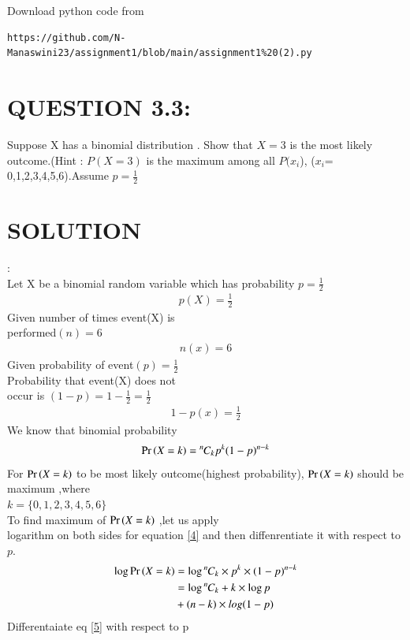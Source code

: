 \documentclass[journal,12pt,twocolumn]{IEEEtran}
\newcommand*{\permcomb}[4][0mu]{{{}^{#3}\mkern#1#2_{#4}}}
\newcommand*{\comb}[1][-1mu]{\permcomb[#1]{C}}
\begin{document}
\renewcommand{\thefigure}{\theenumi}
\renewcommand{\thetable}{\theenumi}

Download python code from 
\begin{lstlisting}
https://github.com/N-Manaswini23/assignment1/blob/main/assignment1%20(2).py
\end{lstlisting}
%



\section*{ QUESTION 3.3:}
Suppose X has a binomial
 distribution . Show that $X = 3$ is the most likely outcome.(Hint : $P(X = 3)$ is the maximum among all $P(x_i$), ($x_i$= 0,1,2,3,4,5,6).Assume $p=\frac{1}{2}$ 
 \\
\section*{SOLUTION}:\\
Let X be a binomial random variable which has probability  $p=\frac{1}{2}$ 
 \begin{align}
p(X)=\frac{1}{2} \label{1}
 \end{align}
Given number of times event(X) is\\
 performed$(n)=6$
 \begin{align}
 n(x)=6 \label{2}
 \end{align}
Given probability of event$(p)= \frac{1}{2}$\\
Probability that event(X) does not \\occur is
$(1-p)=1-\frac{1}{2}=\frac{1}{2} $
 \begin{align}
1-p(x)=\frac{1}{2}\label{3}
 \end{align}
We know that binomial probability
\begin{align}
\pr{X=k} = \comb{n}{k} p^k({1-p})^{n-k}  \label{4} 
\end{align}
For $\Pr\left(X=k\right)$ to be most likely outcome(highest probability),
 $\Pr\left(X=k\right)$  should be maximum ,where\\
$ k=\{0,1,2,3,4,5,6\}$\\
To find maximum of  $\Pr\left(X=k\right)$  ,let us  apply \\logarithm on both sides for equation \eqref{4} and then diffenrentiate it with respect
to $p$.
\begin{align}
\log  \pr{X=k} &=\log  \comb{n}{k} \times p^k\times ({1-p})^{n-k} \\
&=\log \comb{n}{k} +k \times \log p \notag \\
 &+(n-k)\times log (1-p) \label{5}
\end{align}
Differentaiate eq \eqref{5} with respect to p
\end{document}
